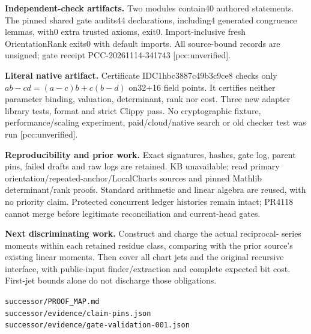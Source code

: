 \documentclass[10pt]{article}
\begin{document}
\textbf{Independent-check artifacts.} Two modules contain40 authored
statements. The pinned shared gate audits44 declarations, including4
generated congruence lemmas, with0 extra trusted axioms, exit0. Import-inclusive
fresh OrientationRank exits0 with default imports. All source-bound records
are unsigned; gate receipt PCC-20261114-341743 [pcc:unverified].

\textbf{Literal native artifact.} Certificate IDC1hbc3887c49b3c9ce8 checks
only $ab-cd=(a-c)b+c(b-d)$ on32+16 field points. It certifies neither
parameter binding, valuation, determinant, rank nor cost. Three new adapter
library tests, format and strict Clippy pass. No cryptographic fixture,
performance/scaling experiment, paid/cloud/native search or old checker test
was run [pcc:unverified].

\textbf{Reproducibility and prior work.} Exact signatures, hashes, gate log,
parent pins, failed drafts and raw logs are retained. KB unavailable; read
primary orientation/repeated-anchor/LocalCharts sources and pinned Mathlib
determinant/rank proofs. Standard arithmetic and linear algebra are reused,
with no priority claim. Protected concurrent ledger histories remain intact;
PR4118 cannot merge before legitimate reconciliation and current-head gates.

\textbf{Next discriminating work.} Construct and charge the actual reciprocal-
series moments within each retained residue class, comparing with the prior
source's existing linear moments. Then cover all chart jets and the original
recursive interface, with public-input finder/extraction and complete expected
bit cost. First-jet bounds alone do not discharge those obligations.

{\small\texttt{successor/PROOF\_MAP.md}\\
\texttt{successor/evidence/claim-pins.json}\\
\texttt{successor/evidence/gate-validation-001.json}}
\end{document}
